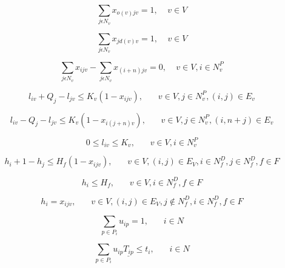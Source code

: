 \documentclass[a4paper,12pt]{article}
\begin{document}
\begin{equation} \label{eq:5}
    \sum_{j\epsilon N_v}x_{o(v)jv} = 1, ~~~~~ v \in V
\end{equation}

\begin{equation} \label{eq:6}
    \sum_{j\epsilon N_v}x_{j d(v)v} = 1, ~~~~~ v \in V
\end{equation}

\begin{equation} \label{eq:7}
    \sum_{j\epsilon N_v}x_{ijv} - \sum_{j\epsilon N_v}x_{(i+n)jv} = 0, ~~~~~ v \in V, i\in N^P_v
\end{equation}

\begin{equation} \label{eq:8}
    l_{iv} + Q_j - l_{jv} \leq K_v(1-x_{ijv}),~~~~~~~~ v \in V,j\in N_v^P,(i,j) \in E_v
\end{equation}

\begin{equation} \label{eq:9}
    l_{iv} - Q_j - l_{jv} \leq K_v(1-x_{i(j+n)v}), ~~~~~~~~ v \in V,j\in N_v^P, (i, n+j)\in E_v
\end{equation}

\begin{equation} \label{eq:10}
0 \leq l_{iv} \leq K_v, ~~~~~~~~ v \in V, i \in N^P_v
\end{equation}

\begin{equation} \label{eq:11}
    h_{i} + 1 - h_{j} \leq H_f(1-x_{ijv}), ~~~~~~~~ v \in V, (i,j)\in E_V, i\in N^D_f, j\in N^D_f, f\in F
\end{equation}

\begin{equation} \label{eq:12}
    h_{i} \leq H_f, ~~~~~~~~ v\in V, i\in N_f^D, f\in F
\end{equation}

\begin{equation} \label{eq:13}
    h_{i} = x_{ijv}, ~~~~~~~~ v \in V, (i, j)\in E_V, j \notin N_f^D, i \in N^D_f, f \in F
\end{equation}

\begin{equation} \label{eq:15}
    \sum_{p\in P_i} u_{ip} = 1, ~~~~~~~~ i\in N
\end{equation}

\begin{equation} \label{eq:15}
    \sum_{p\in P_i} u_{ip}\underline{T_{ip}} \leq t_{i}, ~~~~~~~~ i\in N
\end{equation}
\end{document}
